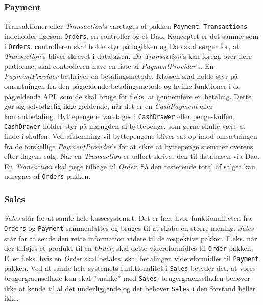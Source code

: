 \subsubsection{Payment}
Transaktioner eller \textit{Transaction}'s varetages af pakken \texttt{Payment}. \texttt{Transactions} indeholder ligesom \texttt{Orders}, en \Gls{controller} og et \Gls{Dao}. Konceptet er det samme som i \texttt{Orders}. \Gls{controller}en skal holde styr på logikken og \Gls{Dao} skal sørger for, at \textit{Transaction}'s bliver skrevet i databasen.
\newline\newline
Da \textit{Transaction}'s kan foregå over flere platforme, skal \gls{controller}en have en liste af \textit{PaymentProvider}'s. En \textit{PaymentProvider}  beskriver en betalingsmetode. Klassen skal holde styr på omsætningen fra den pågældende betalingsmetode og hvilke funktioner i de pågældende \gls{API}, som de skal bruge for f.eks. at gennemføre en betaling. Dette gør sig selvfølgelig ikke gældende, når det er en \textit{CashPayment} eller kontantbetaling. Byttepengene varetages i \texttt{CashDrawer} eller pengeskuffen. \texttt{CashDrawer} holder styr på mængden af byttepenge, som gerne skulle være at finde i skuffen. Ved afstemning vil byttepengene bliver sat op imod omsætningen fra de forskellige \textit{PaymentProvider}'s for at sikre at byttepenge stemmer overens efter dagens salg.
\newline\newline
Når en \textit{Transaction} er udført skrives den til databasen via \gls{Dao}. En \textit{Transaction} skal pege tilbage til \textit{Order}. Så den resterende total af salget kan udregnes af \texttt{Orders} pakken.

\subsubsection{Sales}
\textit{Sales} står for at samle hele kassesystemet. Det er her, hvor funktionaliteten fra \texttt{Orders} og \texttt{Payment} sammenfattes og bruges til at skabe en større mening. \textit{Sales} står for at sende den rette information videre til de respektive pakker. F.eks. når der tilføjes et produkt til en \textit{Order}, skal dette videreformidles til \texttt{Order} pakken. Eller f.eks. hvis en \textit{Order} skal betales, skal betalingen videreformidles til \texttt{Payment} pakken.
\newline\newline
Ved at samle hele systemets funktionalitet i \texttt{Sales} betyder det, at vores \gls{brugergraenseflade} kun skal ''snakke'' med \texttt{Sales}. \Gls{brugergraenseflade}n behøver ikke at kende til al det underliggende og det behøver \texttt{Sales} i den forstand heller ikke.